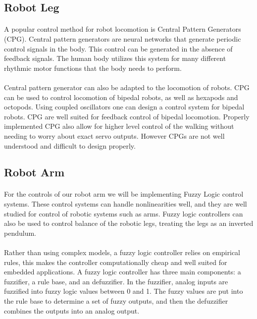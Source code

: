 \documentclass[titlepage,letterpaper,12pt]{article}
\begin{document}
\subsection{Robot Leg}
\paragraph{}A popular control method for robot locomotion is Central Pattern
Generators (CPG). Central pattern generators are neural networks that generate
periodic control signals in the body. This control can be generated in the
absence of feedback signals. The human body utilizes this
system for many different rhythmic motor functions that the body needs to
perform\cite{cpggeneral}. 

\paragraph{}Central pattern generator can also be adapted to the locomotion of
robots. CPG can be used to control locomotion of bipedal robots, as well as
hexapods and octopods. Using coupled oscillators one can design a control system
for bipedal robots. CPG are well suited for feedback control of bipedal
locomotion. Properly implemented CPG also allow for higher level control of the
walking without needing to worry about exact servo outputs. However CPGs are not
well understood and difficult to design properly\cite{Ijspeert2008}.

\subsection{Robot Arm}
\paragraph{}For the controls of our robot arm we will be implementing Fuzzy
Logic control systems. These control systems can handle nonlinearities well, and
they are well studied for control of robotic systems such as
arms\cite{Scharf1985}.  Fuzzy logic controllers can also be used to control
balance of the robotic legs, treating the legs as an inverted
pendulum\cite{hwang1992stability}.

\paragraph{}Rather than using complex models, a fuzzy logic controller relies on
empirical rules, this makes the controller computationally cheap and well suited
for embedded applications. A fuzzy logic controller has three main components: a
fuzzifier, a rule base, and an defuzzifier. In the fuzzifier, analog inputs are
fuzzified into fuzzy logic values between 0 and 1. The fuzzy values are put into
the rule base to determine a set of fuzzy outputs, and then the defuzzifier
combines the outputs into an analog output\cite{Mailah2000}.
\end{document}
